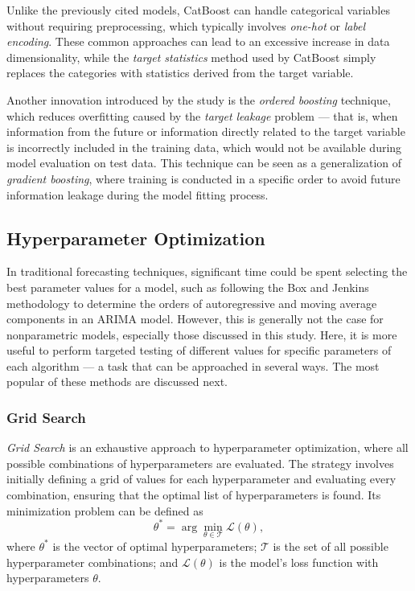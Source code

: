 Unlike the previously cited models, CatBoost can handle categorical variables without requiring preprocessing, which typically involves \textit{one-hot} or \textit{label encoding}. These common approaches can lead to an excessive increase in data dimensionality, while the \textit{target statistics} method used by CatBoost simply replaces the categories with statistics derived from the target variable.

Another innovation introduced by the study is the \textit{ordered boosting} technique, which reduces overfitting caused by the \textit{target leakage} problem — that is, when information from the future or information directly related to the target variable is incorrectly included in the training data, which would not be available during model evaluation on test data. This technique can be seen as a generalization of \textit{gradient boosting}, where training is conducted in a specific order to avoid future information leakage during the model fitting process.

\subsection{Hyperparameter Optimization}
In traditional forecasting techniques, significant time could be spent selecting the best parameter values for a model, such as following the Box and Jenkins methodology to determine the orders of autoregressive and moving average components in an ARIMA model. However, this is generally not the case for nonparametric models, especially those discussed in this study. Here, it is more useful to perform targeted testing of different values for specific parameters of each algorithm — a task that can be approached in several ways. The most popular of these methods are discussed next.

\subsubsection{Grid Search}
\textit{Grid Search} is an exhaustive approach to hyperparameter optimization, where all possible combinations of hyperparameters are evaluated. The strategy involves initially defining a grid of values for each hyperparameter and evaluating every combination, ensuring that the optimal list of hyperparameters is found. Its minimization problem can be defined as
\begin{equation}
    \theta^* = \arg\min_{\theta \in \mathcal{T}} \mathcal{L}(\theta),
\end{equation}
where $\theta^*$ is the vector of optimal hyperparameters; $\mathcal{T}$ is the set of all possible hyperparameter combinations; and $\mathcal{L}(\theta)$ is the model's loss function with hyperparameters $\theta$.


